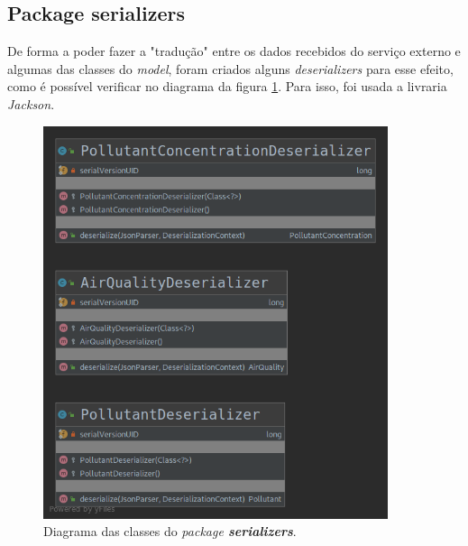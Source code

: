 \subsection{Package serializers}
De forma a poder fazer a "tradução" entre os dados recebidos do serviço externo e algumas das classes do \textit{model}, foram criados alguns \textit{deserializers} para esse efeito, como é possível verificar no diagrama da figura \ref{fig:serializers_diagram}. Para isso, foi usada a livraria \textit{Jackson}.
\begin{figure}[h]
   \centering
   \includegraphics[width=0.90\textwidth]{images/serializers_diagram}
   \caption{Diagrama das classes do \textit{package \textbf{serializers}}.}
   \label{fig:serializers_diagram}
\end{figure}


